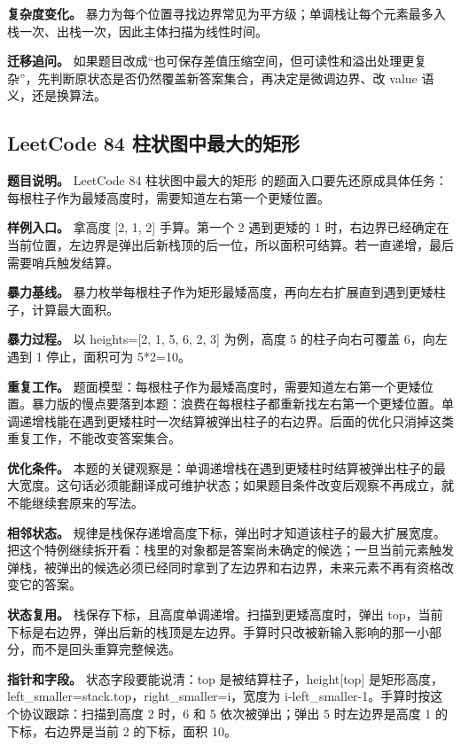 \textbf{复杂度变化。} 暴力为每个位置寻找边界常见为平方级；单调栈让每个元素最多入栈一次、出栈一次，因此主体扫描为线性时间。

\textbf{迁移追问。} 如果题目改成“也可保存差值压缩空间，但可读性和溢出处理更复杂”，先判断原状态是否仍然覆盖新答案集合，再决定是微调边界、改 value 语义，还是换算法。

\subsection{LeetCode 84 柱状图中最大的矩形}

\textbf{题目说明。} LeetCode 84 柱状图中最大的矩形 的题面入口要先还原成具体任务：每根柱子作为最矮高度时，需要知道左右第一个更矮位置。

\textbf{样例入口。} 拿高度 [2, 1, 2] 手算。第一个 2 遇到更矮的 1 时，右边界已经确定在当前位置，左边界是弹出后新栈顶的后一位，所以面积可结算。若一直递增，最后需要哨兵触发结算。

\textbf{暴力基线。} 暴力枚举每根柱子作为矩形最矮高度，再向左右扩展直到遇到更矮柱子，计算最大面积。

\textbf{暴力过程。} 以 heights=[2, 1, 5, 6, 2, 3] 为例，高度 5 的柱子向右可覆盖 6，向左遇到 1 停止，面积可为 5*2=10。

\textbf{重复工作。} 题面模型：每根柱子作为最矮高度时，需要知道左右第一个更矮位置。暴力版的慢点要落到本题：浪费在每根柱子都重新找左右第一个更矮位置。单调递增栈能在遇到更矮柱时一次结算被弹出柱子的右边界。后面的优化只消掉这类重复工作，不能改变答案集合。

\textbf{优化条件。} 本题的关键观察是：单调递增栈在遇到更矮柱时结算被弹出柱子的最大宽度。这句话必须能翻译成可维护状态；如果题目条件改变后观察不再成立，就不能继续套原来的写法。

\textbf{相邻状态。} 规律是栈保存递增高度下标，弹出时才知道该柱子的最大扩展宽度。把这个特例继续拆开看：栈里的对象都是答案尚未确定的候选；一旦当前元素触发弹栈，被弹出的候选必须已经同时拿到了左边界和右边界，未来元素不再有资格改变它的答案。

\textbf{状态复用。} 栈保存下标，且高度单调递增。扫描到更矮高度时，弹出 top，当前下标是右边界，弹出后新的栈顶是左边界。手算时只改被新输入影响的那一小部分，而不是回头重算完整候选。

\textbf{指针和字段。} 状态字段要能说清：top 是被结算柱子，height[top] 是矩形高度，left\_smaller=stack.top，right\_smaller=i，宽度为 i-left\_smaller-1。手算时按这个协议跟踪：扫描到高度 2 时，6 和 5 依次被弹出；弹出 5 时左边界是高度 1 的下标，右边界是当前 2 的下标，面积 10。

